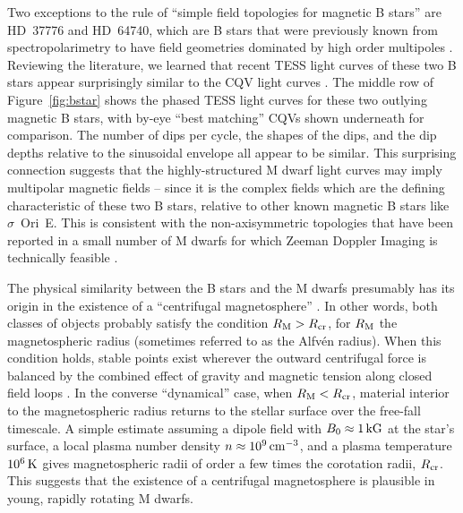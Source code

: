 \documentclass[11pt,twocolumn,tighten]{aastex63}
\begin{document}
Two exceptions to the rule of ``simple field topologies for magnetic B
stars'' are HD~37776 and HD~64740, which are B stars that were
previously known from spectropolarimetry to have field geometries
dominated by high order multipoles \citep{2011ApJ...726...24K}.
Reviewing the literature, we learned that recent TESS light curves of
these two B stars appear surprisingly similar to the CQV light curves
\citep{2020pase.conf...46M}.  The middle row of Figure~\ref{fig:bstar}
shows the phased TESS light curves for these two outlying magnetic B
stars, with by-eye ``best matching'' CQVs shown underneath for comparison.  The
number of dips per cycle, the shapes of the dips, and the dip depths
relative to the sinusoidal envelope all appear to be similar.  This surprising connection 
suggests that the
highly-structured M dwarf light curves may imply multipolar magnetic
fields -- since it is the complex fields which are the defining
characteristic of these two B stars, relative to other known magnetic
B stars like $\sigma$~Ori~E.  This is consistent with the
non-axisymmetric topologies that have been reported in a small number
of M dwarfs for which Zeeman Doppler Imaging is technically feasible
\citep[see][and references therein]{2021A&ARv..29....1K}.

The physical similarity between the B stars and the M dwarfs
presumably has its origin in the existence of a ``centrifugal
magnetosphere'' \citep[see][]{2013MNRAS.429..398P}.  In other words,
both classes of objects probably satisfy the condition $R_{\rm M} >
R_{\rm cr}$, for $R_{\rm M}$ the magnetospheric radius (sometimes
referred to as the Alfv\'en radius).  When this condition
holds, stable points exist wherever the outward centrifugal force is
balanced by the combined effect of gravity and magnetic tension along
closed field loops \citep{1985Ap&SS.116..285N}.  In the converse
``dynamical'' case, when  $R_{\rm M} < R_{\rm cr}$, material
interior to the magnetospheric radius returns to the stellar surface
over the free-fall timescale.  A simple estimate assuming a dipole
field with $B_0\approx1\,{\rm kG}$ at the star's surface, a local
plasma number density $n\approx10^9\,{\rm cm^{-3}}$, and a plasma
temperature $10^6\,{\rm K}$ gives magnetospheric radii of order a few
times the corotation radii, $R_{\rm cr}$.  This suggests that the
existence of a centrifugal magnetosphere is plausible in young,
rapidly rotating M dwarfs.


\end{document}
